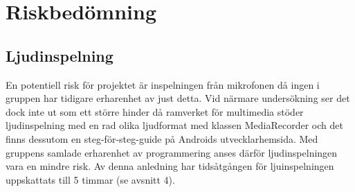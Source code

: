 \section{Riskbedömning}
\subsection{Ljudinspelning}
En potentiell risk för projektet är inspelningen från mikrofonen då ingen i gruppen har tidigare erharenhet av just detta. Vid närmare undersökning ser det dock inte ut som ett större hinder då ramverket för multimedia stöder ljudinspelning med en rad olika ljudformat med klassen MediaRecorder \parencite{sound} och det finns dessutom en steg-för-steg-guide på Androids utvecklarhemsida. Med gruppens samlade erharenhet av programmering anses därför ljudinspelningen vara en mindre risk. Av denna anledning har tidsåtgången för ljuinspelningen uppskattats till 5 timmar (se avsnitt 4).